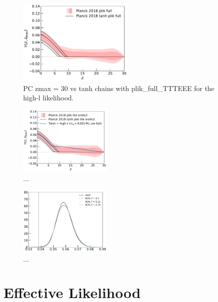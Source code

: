 \documentclass[prd,twocolumn,amsmath,amssymb,floatfix,superscriptaddress,nofootinbib]{revtex4-1}
\begin{document}
\begin{figure}[ht]
\includegraphics[width=0.5\textwidth]{results/direct_mcmc/pl18_plots_zmax30/plot_pub_tau_gtz_dz_0p1_pl18_pc_zmax30_plikfull_and_pl18_tanh_post_plikfull.pdf}
\caption{PC zmax = 30 vs tanh chains with plik\_full\_TTTEEE for the high-l likelihood.
}
\label{fig:}
\end{figure}


\begin{figure}
\includegraphics[width=0.40\textwidth]{plots/plot_tau_gtz.pdf}
\caption{...
}
\label{fig:}
\end{figure}


\begin{figure}
\includegraphics[width=0.40\textwidth]{plots/pl18_pc_zmax30_pliklite_srollv2_1015_tau_posterior_fraccov_1p0_burnin_10000_yes_norm_gaussian0p1_0p12_0p14.pdf}
\caption{...
}
\label{fig:}
\end{figure}




\section{Effective Likelihood}
\label{sec:effective_likelihood}
\end{document}
